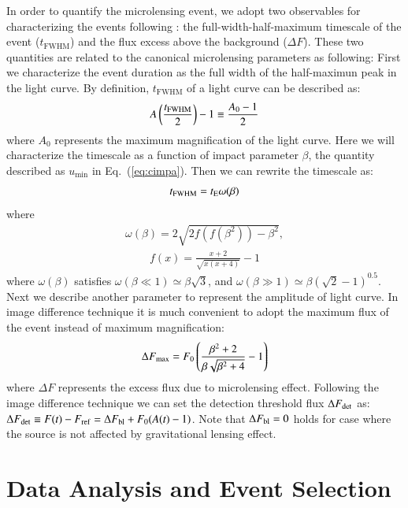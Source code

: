\documentclass[iop, apj]{emulateapj}
\newcommand{\?}{\stackrel{?}{=}}
\begin{document}
In order to quantify the microlensing event, we adopt two observables for characterizing the events following \citet{Riffeseretal:06}: the full-width-half-maximum timescale of the event ($t_\mathrm{FWHM}$) and the flux excess above the background ($\Delta F$). These two quantities are related to the canonical microlensing parameters as following: 
%
First we characterize the event duration as the full width of the half-maximun peak in the light curve. 
By definition, $t_\mathrm{FWHM}$ of a light curve can be described as: 
%
\begin{eqnarray}
A\left(\frac{t_{\rm FWHM}}{2}\right)-1\equiv\frac{A_0-1}{2}
\end{eqnarray}
%
where $A_0$ represents the maximum magnification of the light curve. Here we will characterize the timescale as a function of impact parameter $\beta$, the quantity described as $u_\mathrm{min}$ in Eq.~(\ref{eq:cimpa}). Then we can rewrite the timescale as: %
%
\begin{eqnarray}
t_{\rm FWHM}=t_{\rm E}\omega(\beta)
\end{eqnarray}
%
where 
%
\begin{eqnarray}
\omega(\beta)=2\sqrt{2f(f(\beta^2))-\beta^2},
\end{eqnarray}
%
\begin{eqnarray}
f(x)=\frac{x+2}{\sqrt{x(x+4)}}-1
\end{eqnarray}
%
where $\omega(\beta)$ satisfies $\omega(\beta\ll1)\simeq \beta\sqrt{3}$, and $\omega(\beta\gg1)\simeq\beta(\sqrt{2}-1)^{0.5}$. 
Next we describe another parameter to represent the amplitude of light curve. In image difference technique it is much convenient to adopt the maximum flux of the event instead of maximum magnification: 
%
\begin{eqnarray}
\Delta F_{\rm max}=F_0\left(\frac{\beta^2+2}{\beta\sqrt{\beta^2+4}}-1\right)
\label{eq:diffmicro}
\end{eqnarray}
%
where $\Delta F$ represents the excess flux due to microlensing effect. Following the image difference technique we can set the detection threshold flux $\Delta F_{\rm det}$ as: 
$\Delta F_{\rm det}\equiv F(t)-F_{\rm ref}=\Delta F_{\rm bl}+F_0(A(t)-1)$. 
Note that $\Delta F_{\rm bl}=0$ holds for case where the source is not affected by gravitational lensing effect. 




\section{Data Analysis and Event Selection}%
\label{sec:obs2}
\end{document}
